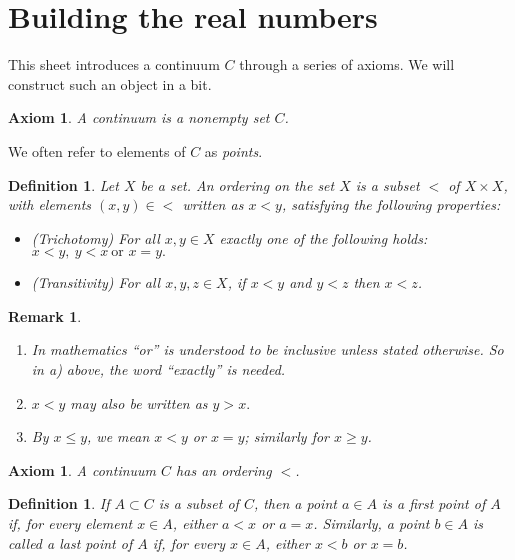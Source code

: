 \documentclass{amsart}
\newtheorem{axiom}[theorem]{Axiom}
\newtheorem{definition}[theorem]{Definition}
\newtheorem{remark}[theorem]{Remark}
\newcommand{\1}{\mathds{1}}
\numberwithin{equation}{section}
\numberwithin{theorem}{section}
\begin{document}
\bigskip \section{Building the real numbers}


This sheet introduces a continuum $C$ through a series of axioms.  We will construct such an object in a bit.



\begin{axiom} A continuum is a nonempty set $C$.  
\end{axiom}

We often refer to elements of $C$ as \emph{points}.


\begin{definition}  Let $X$ be a set.  An \emph{ordering} on the set $X$ is a subset $<$ of $X \times X$, with elements $(x, y) \in <$ written as $x < y$, satisfying the following properties:
	
	\begin{itemize}
		\item[(a)] {\it (Trichotomy) }
		For all $x, y \in X$ exactly one of the following holds:
		$x < y,\  y < x\   \text{or } x=y.$ 
		
		\item[(b)] {\it (Transitivity)} For all $x, y, z \in X$, if $x < y$ and $y < z$ then $x < z$.
	\end{itemize}
\end{definition}


\begin{remark}
	\begin{enumerate}
		\item[a)]  In mathematics ``or'' is understood to be inclusive unless stated otherwise. So in a) above, the word ``exactly'' is needed.
		\item[b)] $x<y$ may also be written as $y>x.$
		\item[c)] By $x \leq y$, we mean $x < y$ or $x = y$;  similarly for $x \geq y$.
	\end{enumerate}
\end{remark}


\begin{axiom}  A continuum $C$ has an ordering $<$.
\end{axiom}



\begin{definition}  If $A \subset C$ is a subset of $C$, then a point $a \in A$ is a \emph{first} point of $A$ if, for every element $x \in A$, either $a < x$ or $a = x$.  Similarly, a point $b \in A$ is called a \emph{last} point of $A$ if, for every $x \in A$, either $x < b$ or $x = b$.
\end{definition}
\end{document}
